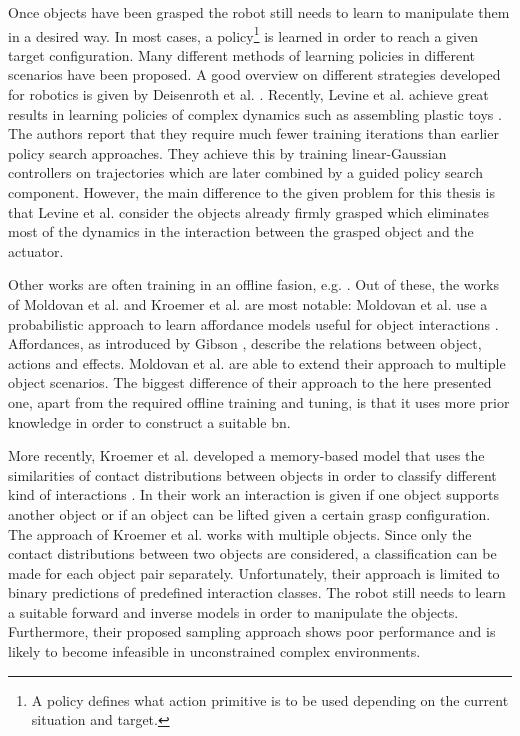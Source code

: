 Once objects have been grasped the robot still needs to learn to manipulate them in a desired way. In most cases, a policy\footnote{A policy defines what action primitive is to be used depending on the current situation and target.} is learned in order to reach a given target configuration. Many different methods of learning policies in different scenarios have been proposed. A good overview on different strategies developed for robotics is given by Deisenroth et al. \cite{deisenroth2013survey}. Recently, Levine et al. achieve great results in learning policies of complex dynamics such as assembling plastic toys \cite{levine2015learning}. The authors report that they require much fewer training iterations than earlier policy search approaches. They achieve this by training linear-Gaussian controllers on trajectories which are later combined by a guided policy search component.
However, the main difference to the given problem for this thesis is that Levine et al. consider the objects already firmly grasped which eliminates most of the dynamics in the interaction between the grasped object and the actuator.

Other works are often training in an offline fasion, e.g. 
\cite{nishide2008predicting, moldovan2012learning, contactPrediction}. Out of these, the works of Moldovan et al. and Kroemer et al. are most notable:
Moldovan et al. use a probabilistic approach to learn affordance models useful for object interactions \cite{moldovan2012learning}. Affordances, as introduced by Gibson \cite{affordances}, describe the relations between object, actions and effects. Moldovan et al. are able to extend their approach to multiple object scenarios. The biggest difference of their approach to the here presented one, apart from the required offline training and tuning, is that it uses more prior knowledge in order to construct a suitable \gls{bn}.

More recently, Kroemer et al. developed a memory-based model that uses the similarities of contact distributions between objects in order to classify different kind of interactions \cite{contactPrediction}. In their work an interaction is given if one object supports another object or if an object can be lifted given a certain grasp configuration. The approach of Kroemer et al. works with multiple objects. Since only the contact distributions between two objects are considered, a classification can be made for each object pair separately. Unfortunately, their approach is limited to binary predictions of predefined interaction classes. The robot still needs to learn a suitable forward and inverse models in order to manipulate the objects. Furthermore, their proposed sampling approach shows poor performance and is likely to become infeasible in unconstrained complex environments.

